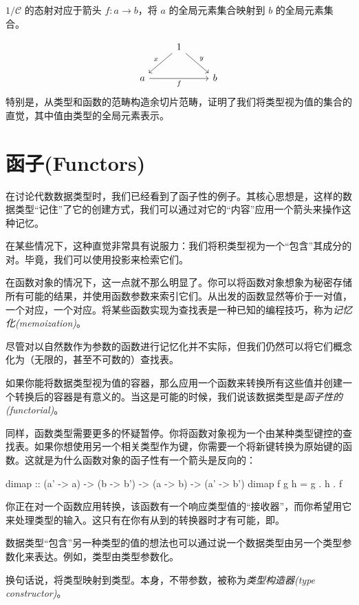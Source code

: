 \documentclass[DaoFP]{subfiles}
\begin{document}
$1/  \mathcal{C}$ 的态射对应于箭头 $f \colon a \to b$，将 $a$ 的全局元素集合映射到 $b$ 的全局元素集合。

 \[
 \begin{tikzcd}
& 1
 \arrow[rd, "y"]
 \arrow[ld, "x"']
 \\
a
\arrow[rr, "f"']
&& b
  \end{tikzcd}
\]
特别是，从类型和函数的范畴构造余切片范畴，证明了我们将类型视为值的集合的直觉，其中值由类型的全局元素表示。

\section{函子(Functors)}

在讨论代数数据类型时，我们已经看到了函子性的例子。其核心思想是，这样的数据类型“记住”了它的创建方式，我们可以通过对它的“内容”应用一个箭头来操作这种记忆。

在某些情况下，这种直觉非常具有说服力：我们将积类型视为一个“包含”其成分的对。毕竟，我们可以使用投影来检索它们。

在函数对象的情况下，这一点就不那么明显了。你可以将函数对象想象为秘密存储所有可能的结果，并使用函数参数来索引它们。从出发的函数显然等价于一对值，一个对应，一个对应。将某些函数实现为查找表是一种已知的编程技巧，称为\emph{记忆化(memoization)}。

尽管对以自然数作为参数的函数进行记忆化并不实际，但我们仍然可以将它们概念化为（无限的，甚至不可数的）查找表。

如果你能将数据类型视为值的容器，那么应用一个函数来转换所有这些值并创建一个转换后的容器是有意义的。当这是可能的时候，我们说该数据类型是\emph{函子性的(functorial)}。

同样，函数类型需要更多的怀疑暂停。你将函数对象视为一个由某种类型键控的查找表。如果你想使用另一个相关类型作为键，你需要一个将新键转换为原始键的函数。这就是为什么函数对象的函子性有一个箭头是反向的：
\begin{haskell}
dimap :: (a' -> a) -> (b -> b') -> (a -> b) -> (a' -> b')
dimap f g h = g . h . f
\end{haskell}
你正在对一个函数应用转换，该函数有一个响应类型值的“接收器”，而你希望用它来处理类型的输入。这只有在你有从到的转换器时才有可能，即。

数据类型“包含”另一种类型的值的想法也可以通过说一个数据类型由另一个类型参数化来表达。例如，类型由类型参数化。

换句话说，将类型映射到类型。本身，不带参数，被称为\emph{类型构造器(type constructor)}。
\end{document}
